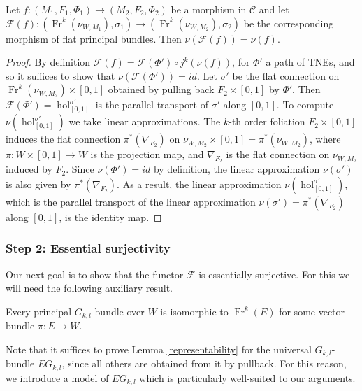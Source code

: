 \documentclass[10pt]{amsart}
\newcommand{\F}{{\mathcal{F}}}
\newcommand{\hol}{{\operatorname{hol}}}
\newcommand{\Fr}{{\operatorname{Fr}}}
\numberwithin{theoremalpha}{section}
\numberwithin{equation}{section}
\numberwithin{definition}{section}
\numberwithin{theorem}{section}
\numberwithin{proposition}{section}
\numberwithin{lemma}{section}
\numberwithin{example}{section}
\numberwithin{remark}{section}
\numberwithin{corollary}{section}
\numberwithin{question}{section}
\numberwithin{problem}{section}
\numberwithin{assumption}{section}
\theoremstyle{named}
\numberwithin{equation}{section}
\begin{document}
\begin{lemma} \label{Flinearization}
Let $f: (M_{1}, F_{1}, \Phi_{1}) \to (M_{2}, F_{2}, \Phi_{2})$ be a morphism in $\mathcal{C}$ and let $\F(f) : (\Fr^{k}(\nu_{W, M_{1}}), \sigma_{1}) \to (\Fr^{k}(\nu_{W, M_{2}}), \sigma_{2})$ be the corresponding morphism of flat principal bundles. Then $\nu(\F(f)) = \nu(f)$. 
\end{lemma}
\begin{proof}
By definition $\F(f) = \F(\Phi') \circ j^{k}(\nu(f))$, for $\Phi'$ a path of TNEs, and so it suffices to show that $\nu(\F(\Phi')) = id$. Let $\sigma'$ be the flat connection on $\Fr^{k}(\nu_{W,M_2}) \times [0,1]$ obtained by pulling back $F_2 \times [0,1]$ by $\Phi'$. Then $\F(\Phi') = \hol_{[0,1]}^{\sigma'}$ is the parallel transport of $\sigma'$ along $[0,1]$. To compute $\nu(\hol_{[0,1]}^{\sigma'})$ we take linear approximations. The $k$-th order foliation $F_2 \times [0,1]$ induces the flat connection $\pi^*(\nabla_{F_2})$ on $\nu_{W, M_2} \times [0,1] = \pi^{*}(\nu_{W, M_2})$, where $\pi : W \times [0,1] \to W$ is the projection map, and $\nabla_{F_2}$ is the flat connection on $\nu_{W,M_2}$ induced by $F_{2}$. Since $\nu(\Phi') = id$ by definition, the linear approximation $\nu(\sigma')$ is also given by $\pi^*(\nabla_{F_2})$. As a result, the linear approximation $\nu(\hol_{[0,1]}^{\sigma'})$, which is the parallel transport of the linear approximation $\nu(\sigma') = \pi^*(\nabla_{F_2})$ along $[0,1]$, is the identity map. 
\end{proof}


\subsubsection{Step 2: Essential surjectivity}

Our next goal is to show that the functor $\F$ is essentially surjective. For this we will need the following auxiliary result. 

\begin{lemma} \label{representability}
Every principal $G_{k,l}$-bundle over $W$ is isomorphic to $\Fr^{k}(E)$ for some vector bundle $\pi: E \to W$. 
\end{lemma}

Note that it suffices to prove Lemma \ref{representability} for the universal $G_{k,l}$-bundle $EG_{k,l}$, since all others are obtained from it by pullback. For this reason, we introduce a model of $EG_{k,l}$ which is particularly well-suited to our arguments. 
\end{document}
